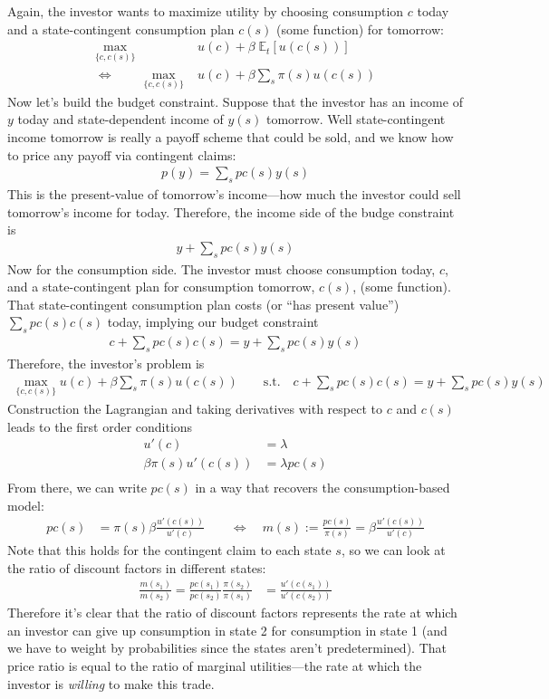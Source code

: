 \documentclass[12pt]{article}
\theoremstyle{plain}
\theoremstyle{definition}
\theoremstyle{remark}
\begin{document}
Again, the investor wants to maximize utility by choosing consumption
$c$ today and a state-contingent consumption plan $c(s)$ (some function)
for tomorrow:
\begin{align*}
  \max_{\{c,c(s)\}} &u(c) + \beta \; \mathbb{E}_t[u(c(s))]\\
  \Leftrightarrow \qquad
  \max_{\{c,c(s)\}} &u(c) + \beta \sum_s \pi(s) u(c(s))
\end{align*}
Now let's build the budget constraint.  Suppose that the investor has an
income of $y$ today and state-dependent income of $y(s)$ tomorrow.  Well
state-contingent income tomorrow is really a payoff scheme that could be
sold, and we know how to price any payoff via contingent claims:
\begin{align*}
  p(y) = \sum_s pc(s) y(s)
\end{align*}
This is the present-value of tomorrow's income---how much the investor
could sell tomorrow's income for today. Therefore, the income side of
the budge constraint is
\begin{align*}
  y + \sum_s pc(s)y(s)
\end{align*}
Now for the consumption side. The investor must choose consumption
today, $c$, and a state-contingent plan for consumption tomorrow,
$c(s)$, (some function). That state-contingent consumption plan costs
(or ``has present value'') $\sum_s pc(s) c(s)$ today, implying
our budget constraint
\begin{align*}
  c + \sum_s pc(s) c(s) = y + \sum_s pc(s) y(s)
\end{align*}
Therefore, the investor's problem is
\begin{align*}
  \max_{\{c,c(s)\}} u(c) + \beta \sum_s \pi(s) u(c(s))
  \qquad \text{s.t.} \quad
  c + \sum_s pc(s) c(s) = y + \sum_s pc(s) y(s)
\end{align*}
Construction the Lagrangian and taking derivatives with respect to $c$
and $c(s)$ leads to the first order conditions
\begin{align*}
  u'(c) &=\lambda \\
  \beta \pi(s) u'(c(s)) &=\lambda pc(s) \\
\end{align*}
From there, we can write $pc(s)$ in a way that recovers the
consumption-based model:
\begin{align*}
  pc(s) &= \pi(s) \beta \frac{u'(c(s))}{u'(c)}
  \qquad\Leftrightarrow
  \quad m(s) := \frac{pc(s)}{\pi(s)} = \beta \frac{u'(c(s))}{u'(c)}
\end{align*}
Note that this holds for the contingent claim to each state $s$, so we
can look at the ratio of discount factors in different states:
\begin{align*}
  \frac{m(s_1)}{m(s_2)}
  = \frac{pc(s_1)}{pc(s_2)}\frac{\pi(s_2)}{\pi(s_1)}
  &= \frac{u'(c(s_1))}{u'(c(s_2))}
\end{align*}
Therefore it's clear that the ratio of discount factors represents the
rate at which an investor can give up consumption in state 2 for
consumption in state 1 (and we have to weight by probabilities since the
states aren't predetermined). That price ratio is equal to the ratio of
marginal utilities---the rate at which the investor is \emph{willing} to
make this trade.
\end{document}
